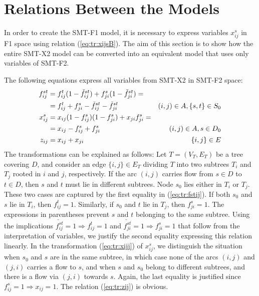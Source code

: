 \section{Relations Between the Models}
\label{sec:comp}

In order to create the SMT-F1 model, it is necessary to express variables  $x^s_{ij}$ in F1 space using relation (\ref{eq:tr:xijsB}).
The aim of this section is to show how the entire SMT-X2 model can be converted into an equivalent model that uses only variables of SMT-F2.
 

The following equations express all variables from SMT-X2 in SMT-F2 space:
\begin{subequations}
\begin{align}
\notag\label{eq:tr:fstij}f^{st}_{ij}&=f^t_{ij}(1-\check{f}^{st}_{ij})+f^{s}_{ji}(1-\check{f}^{st}_{ji})= \\
  &=  f^t_{ij}+f^s_{ji} - \check{f}^{st}_{ij} - \check{f}^{st}_{ji}& (i,j)\in A, \{s,t\}\in S_0\\
\notag\label{eq:tr:xijj}x^s_{ij}&=x_{ij}(1-f^{s}_{ij})(1-f^{s}_{ji})+x_{ji}f^{s}_{ji}=\\
  &= x_{ij}-f^s_{ij} + f^{s}_{ji} & (i,j)\in A, s\in D_0\\
\label{eq:tr:zij}z_{ij}&=x_{ij}+x_{ji}& \{i,j\}\in E
\end{align}
\end{subequations}
The transformations can be explained as follows:
Let $T=(V_T,E_T)$ be a tree covering $D$, and consider an edge $\{i,j\}\in E_T$ dividing $T$ into two subtrees $T_i$ and $T_j$ rooted in $i$ and $j$, respectively.
If the arc $(i,j)$ carries flow from $s\in D$ to $t\in D$, then $s$ and $t$ must lie in different subtrees.
Node $s_0$ lies either in $T_i$ or $T_j$.
These two cases are captured by the first equality in (\ref{eq:tr:fstij}).
If both $s_0$ and $s$ lie in $T_i$, then $f_{ij}^t=1$.
Similarly, if $s_0$ and $t$ lie in $T_j$, then $f_{ji}^s=1$.
The expressions in parentheses prevent $s$ and $t$ belonging to the same subtree.
Using the implications $\check{f^{st}_{ij}}=1\Rightarrow f_{ij}^t=1$ and $\check{f^{st}_{ji}}=1\Rightarrow f_{ji}^s=1$ that follow from the interpretation of variables, we justify the second equality expressing this relation linearly.
In the transformation (\ref{eq:tr:xijj}) of $x_{ij}^s$, we distinguish the situation when $s_0$ and $s$ are in the same subtree, in which case none of the arcs $(i,j)$ and $(j,i)$ carries a flow to $s$, and when $s$ and $s_0$ belong to different subtrees, and there is a flow via $(j,i)$ towards $s$.
Again, the last equality is justified since $f_{ij}^s=1\Rightarrow x_{ij}=1$.
The relation (\ref{eq:tr:zij}) is obvious.

